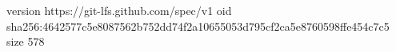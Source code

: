 version https://git-lfs.github.com/spec/v1
oid sha256:4642577c5e8087562b752dd74f2a10655053d795cf2ca5e8760598ffe454c7c5
size 578
